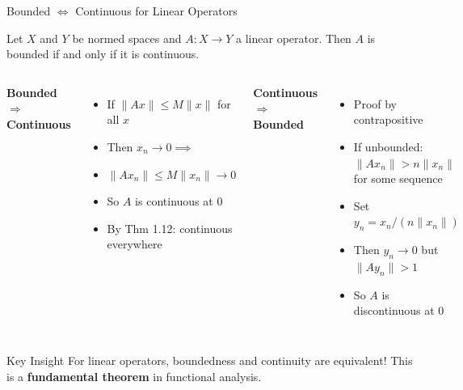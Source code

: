 \documentclass[aspectratio=169,10pt]{beamer}
\begin{document}
\begin{frame}{Bounded $\Leftrightarrow$ Continuous for Linear Operators}
    \begin{theorem}
        Let $X$ and $Y$ be normed spaces and $A : X \to Y$ a linear operator. Then $A$ is bounded if and only if it is continuous.
    \end{theorem}

    \vspace{0.5cm}

    \begin{columns}[T]
        \textbf{Bounded} $\Rightarrow$ \textbf{Continuous}
        \begin{itemize}
            \item If $\|Ax\| \leq M\|x\|$ for all $x$
            \item Then $x_n \to 0 \implies$
            \item $\|Ax_n\| \leq M\|x_n\| \to 0$
            \item So $A$ is continuous at 0
            \item By Thm 1.12: continuous everywhere
        \end{itemize}

        \textbf{Continuous} $\Rightarrow$ \textbf{Bounded}
        \begin{itemize}
            \item Proof by contrapositive
            \item If unbounded: $\|Ax_n\| > n\|x_n\|$ for some sequence
            \item Set $y_n = x_n/(n\|x_n\|)$
            \item Then $y_n \to 0$ but $\|Ay_n\| > 1$
            \item So $A$ is discontinuous at 0
        \end{itemize}
    \end{columns}

    \vspace{0.5cm}

    \begin{alertblock}{Key Insight}
        For linear operators, boundedness and continuity are equivalent! This is a \textbf{fundamental theorem} in functional analysis.
    \end{alertblock}
\end{frame}
\end{document}
